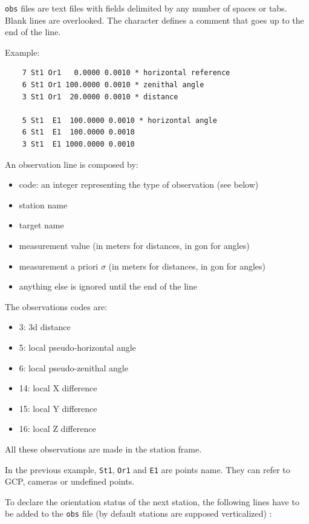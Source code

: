 {\tt obs} files are text files with fields delimited by any number of spaces or tabs. Blank lines are overlooked.
The {\tt *} character defines a comment that goes up to the end of the line.

Example:

\begin{verbatim}
    7 St1 Or1   0.0000 0.0010 * horizontal reference
    6 St1 Or1 100.0000 0.0010 * zenithal angle
    3 St1 Or1  20.0000 0.0010 * distance

    5 St1  E1  100.0000 0.0010 * horizontal angle
    6 St1  E1  100.0000 0.0010
    3 St1  E1 1000.0000 0.0010
\end{verbatim}

An observation line is composed by:

\begin{itemize}
    \item code: an integer representing the type of observation (see below)
    \item station name
    \item target name
    \item measurement value (in meters for distances, in gon for angles)
    \item measurement a priori $\sigma$ (in meters for distances, in gon for angles)
    \item anything else is ignored until the end of the line
\end{itemize}

The observations codes are:

\begin{itemize}
    \item 3: 3d distance
    \item 5: local pseudo-horizontal angle
    \item 6: local pseudo-zenithal angle
    \item 14: local X difference
    \item 15: local Y difference
    \item 16: local Z difference
\end{itemize}

All these observations are made in the station frame.

In the previous example, {\tt St1}, {\tt Or1} and {\tt E1} are points name.
They can refer to GCP, cameras or undefined points.

To declare the orientation status of the next station, the following lines have to be
added to the {\tt obs} file (by default stations are supposed verticalized) :

